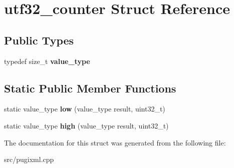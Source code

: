 \hypertarget{structutf32__counter}{}\section{utf32\+\_\+counter Struct Reference}
\label{structutf32__counter}
\subsection*{Public Types}
\begin{DoxyCompactItemize}
\item 
\mbox{\label{structutf32__counter_a6fb6728fe1a009958000f0e934fa6500}} 
typedef size\+\_\+t {\bfseries value\+\_\+type}
\end{DoxyCompactItemize}
\subsection*{Static Public Member Functions}
\begin{DoxyCompactItemize}
\item 
\mbox{\label{structutf32__counter_a3a75f4840e0391ed972ddba621d49480}} 
static value\+\_\+type {\bfseries low} (value\+\_\+type result, uint32\+\_\+t)
\item 
\mbox{\label{structutf32__counter_aa72f5248b1dc5937330ab049bf449251}} 
static value\+\_\+type {\bfseries high} (value\+\_\+type result, uint32\+\_\+t)
\end{DoxyCompactItemize}


The documentation for this struct was generated from the following file\+:\begin{DoxyCompactItemize}
\item 
src/pugixml.\+cpp\end{DoxyCompactItemize}
